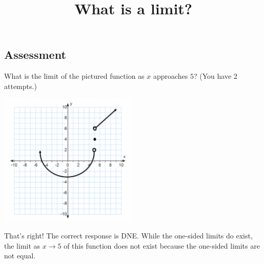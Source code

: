 \documentclass{ximera}
\title{What is a limit?}
\begin{document}
\begin{abstract}
\end{abstract}

\subsection{Assessment}
\begin{question}
What is the limit of the pictured function as $x$ approaches $5$? (You have 2 attempts.)

\includegraphics[width=0.5\textwidth]{graph3.png}
\begin{multipleChoice}  
\end{multipleChoice}  

\begin{explanation}
    That's right! The correct response is DNE. While the one-sided limits do exist, the limit as $x \to 5$ of this function does not exist because the one-sided limits are not equal.
\end{explanation}
\end{question}
\end{document}
